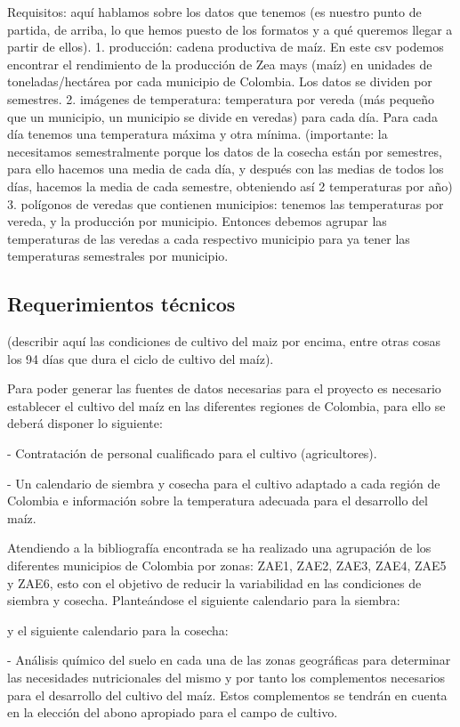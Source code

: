 \documentclass[12pt, spanish]{article}
\begin{document}
Requisitos: aquí hablamos sobre los datos que tenemos (es nuestro punto de partida, de arriba, lo que hemos puesto de los formatos y a qué queremos llegar a partir de ellos).
1. producción: cadena productiva de maíz. En este csv podemos encontrar el rendimiento de la producción de Zea mays (maíz) en unidades de toneladas/hectárea por cada municipio de Colombia. Los datos se dividen por semestres.
2. imágenes de temperatura: temperatura por vereda (más pequeño que un municipio, un municipio se divide en veredas) para cada día. Para cada día tenemos una temperatura máxima y otra mínima. (importante: la necesitamos semestralmente porque los datos de la cosecha están por semestres, para ello hacemos una media de cada día, y después con las medias de todos los días, hacemos la media de cada semestre, obteniendo así 2 temperaturas por año)
3. polígonos de veredas que contienen municipios: tenemos las temperaturas por vereda, y la producción por municipio. Entonces debemos agrupar las temperaturas de las veredas a cada respectivo municipio para ya tener las temperaturas semestrales por municipio.

\subsection{Requerimientos técnicos}

(describir aquí las condiciones de cultivo del maiz por encima, entre otras cosas los 94 días que dura el ciclo de cultivo del maíz).

Para poder generar las fuentes de datos necesarias para el proyecto es necesario establecer el cultivo del maíz en las diferentes regiones de Colombia, para ello se deberá disponer lo siguiente:

- Contratación de personal cualificado para el cultivo (agricultores).

- Un calendario de siembra y cosecha para el cultivo adaptado a cada región de Colombia e información sobre la temperatura adecuada para el desarrollo del maíz.

Atendiendo a la bibliografía encontrada se ha realizado una agrupación de los diferentes municipios de Colombia por zonas: 
ZAE1, ZAE2, ZAE3, ZAE4, ZAE5  y ZAE6, esto con el objetivo de reducir la variabilidad en las condiciones de siembra y cosecha. Planteándose el siguiente calendario para la siembra:

y el siguiente calendario para la cosecha: 

- Análisis químico del suelo en cada una de las zonas geográficas para determinar las necesidades nutricionales del mismo y por tanto los complementos necesarios para el desarrollo del cultivo del maíz. Estos complementos se tendrán en cuenta en la elección del abono apropiado para el campo de cultivo.
\end{document}
